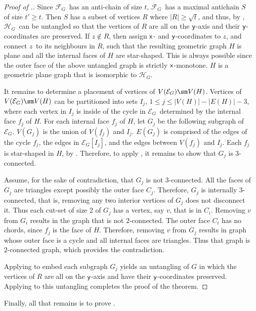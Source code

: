 \documentclass[lotsofwhite,charterfonts, letter]{patmorin}
\newcommand{\x}{\ensuremath{\protect\textup{\textsf{x}}}}
\newcommand{\y}{\ensuremath{\protect\textup{\textsf{y}}}}
\newcommand{\eg}{\ensuremath{\mathcal{E}_G}}
\newcommand{\fg}{\ensuremath{\mathcal{F}_G}}
\newcommand{\hg}{\ensuremath{\mathcal{H}_G}}
\newcommand{\zz}{\ensuremath{z}}
\begin{document}
\begin{proof}[Proof of .]
Since \fg\ has an anti-chain of size $t$, \fg\ has a maximal antichain
$S$ of size $t'\geq t$. Then $S$ has a subset of vertices $R$ where
$|R|\geq \sqrt{t}$, and thus, by , \hg\ can be
untangled so that the vertices of $R$ are all on the \y-axis and their
\y-coordinates are preserved.  If $z\not\in R$, then assign \x- and
\y-coordinates to \zz, and connect \zz\ to its neighbours in $R$, such
that the resulting geometric graph $H$ is plane and all the internal
faces of $H$ are star-shaped. This is always possible since the outer
face of the above untangled graph is strictly \x-monotone. $H$ is a
geometric plane graph that is isomorphic to $\hg$. \Comment{$\eg[R\cup
\zz]$.}

It remains to determine a placement of vertices of $V(\eg)\sm V(H)$.
Vertices of $V(\eg)\sm V(H)$ can be partitioned into sets $I_j$, $1
\leq j\leq |V(H)|-|E(H)|-3$, where each vertex in $I_j$ is inside of
the cycle in \eg\ determined by the internal face $f_j$ of $H$. For
each internal face $f_j$ of $H$, let $G_j$ be the following subgraph
of \eg. $V(G_j)$ is the union of $V(f_j)$ and $I_j$. $E(G_j)$ is
comprised of the edges of the cycle $f_j$, the edges in $\eg[I_j]$,
and the edges between $V(f_j)$ and $I_j$. Each $f_j$ is star-shaped in
$H$, by . Therefore, to apply , it
remains to show that $G_j$ is $3$-connected. 

Assume, for the sake of contradiction, that $G_j$ is not
$3$-connected. All the faces of $G_j$ are triangles except possibly
the outer face $C_j$. Therefore, $G_j$ is internally $3$-connected,
that is, removing any two interior vertices of $G_j$ does not
disconnect it. Thus each cut-set of size $2$ of $G_j$ has a vertex,
say $v$, that is in $C_i$.  Removing $v$ from $G_i$ results in the
graph that is not $2$-connected. The outer face $C_i$ has no chords,
since $f_j$ is the face of $H$. Therefore, removing $v$ from $G_j$
results in graph whose outer face is a cycle and all internal faces
are triangles. Thus that graph is $2$-connected graph, which provides
the contradiction.  

Applying  to embed each subgraph $G_j$ yields an
untangling of $G$ in which the vertices of $R$ are all on the \y-axis
and have their \y-coordinates preserved.  Applying 
to this untangling completes the proof of the theorem.
\end{proof}

Finally, all that remains is to prove .
\end{document}
